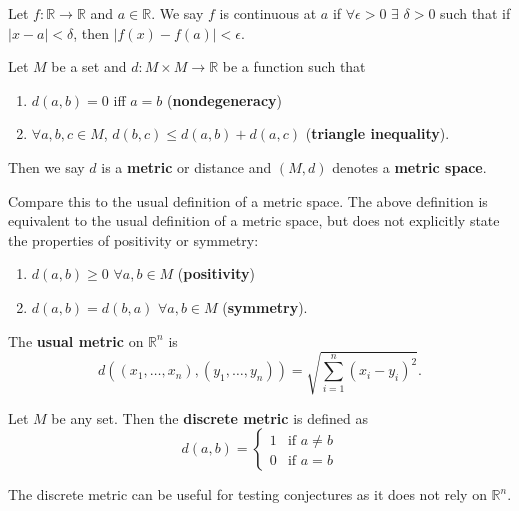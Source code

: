 \begin{definition} Let $f : \mathbb{R} \rightarrow \mathbb{R}$ and $a \in \mathbb{R}$. We say $f$ is continuous at $a$ if $\forall \epsilon > 0$ $\exists$ $\delta > 0$ such that if $|x-a|<\delta$, then $|f(x)-f(a)|<\epsilon$. 
\end{definition}

\begin{definition}
 Let $M$ be a set and $d: M \times M \rightarrow \mathbb{R}$ be a function such that 
	\begin{enumerate}
		\item $d(a,b)=0$ iff $a=b$ (\textbf{nondegeneracy})
		\item $\forall a,b,c \in M$, $d(b,c) \leq d(a,b) + d(a,c)$ (\textbf{triangle inequality}).
	\end{enumerate}
Then we say $d$ is a \textbf{metric} or distance and $(M,d)$ denotes a \textbf{metric space}. 
\end{definition}

\noindent Compare this to the usual definition of a metric space. The above definition is equivalent to the usual definition of a metric space, but does not explicitly state the properties of positivity or symmetry:
	\begin{enumerate}
		\item $d(a,b) \geq 0$ $\forall a,b \in M$ (\textbf{positivity})
		\item $d(a,b) = d(b,a)$ $\forall a,b \in M$ (\textbf{symmetry}).
	\end{enumerate}

\begin{definition}
 The \textbf{usual metric} on $\mathbb{R}^{n}$ is
	\begin{displaymath}
		d((x_1,\ldots,x_n),(y_1,\ldots,y_n)) = \sqrt{\sum_{i=1}^n (x_i-y_i)^2}.
	\end{displaymath}
\end{definition}

\begin{definition}
 Let $M$ be any set. Then the \textbf{discrete metric} is defined as
	\begin{displaymath}
		  d(a,b) = \left\{
     						\begin{array}{lr}
       						1 & \text{if } a \neq b \\
       						0 & \text{if } a = b
     							\end{array}
   						 \right.
	\end{displaymath}
\end{definition}
The discrete metric can be useful for testing conjectures as it does not rely on $\mathbb{R}^n$.

